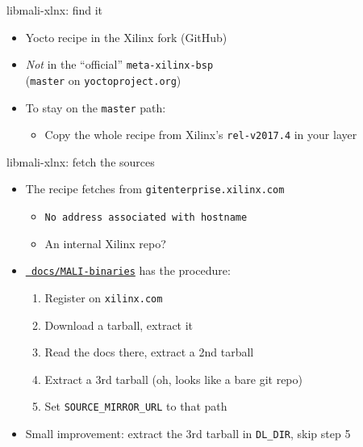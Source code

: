 \documentclass[xetex,table]{beamer}
\begin{document}
\begin{frame}{libmali-xlnx: find it}
  \begin{itemize}
  \item Yocto recipe in the Xilinx fork (GitHub)
  \item {\em Not} in the ``official'' {\tt meta-xilinx-bsp}\\
    ({\tt master} on {\tt yoctoproject.org})
  \item To stay on the {\tt master} path:
    \begin{itemize}
    \item Copy the whole recipe from Xilinx's {\tt rel-v2017.4} in your layer
     \end{itemize}
   \end{itemize}
\end{frame}

\begin{frame}{libmali-xlnx: fetch the sources}
  \begin{itemize}
  \item The recipe fetches from {\tt gitenterprise.xilinx.com}
    \begin{itemize}
    \item[\textrightarrow] {\tt No address associated with hostname}
    \item An internal Xilinx repo?
    \end{itemize}
  \item
    \href{https://github.com/xilinx/meta-xilinx/blob/rel-v2017.4/docs/MALI-binaries}{\tt
      docs/MALI-binaries} has the procedure:
    \begin{enumerate}
    \item Register on {\tt xilinx.com}
    \item Download a tarball, extract it
    \item Read the docs there, extract a 2nd tarball
    \item Extract a 3rd tarball (oh, looks like a bare git repo)
    \item Set {\tt SOURCE\_MIRROR\_URL} to that path
    \end{enumerate}
  \item Small improvement: extract the 3rd tarball in {\tt DL\_DIR}, skip step 5
  \end{itemize}
\end{frame}
\end{document}
